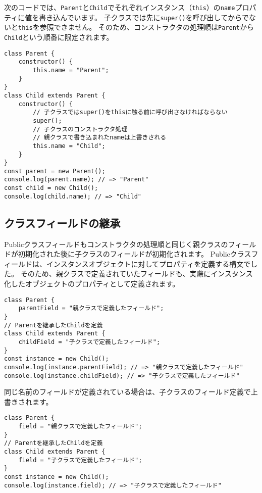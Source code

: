 次のコードでは、\texttt{Parent}と\texttt{Child}でそれぞれインスタンス（\texttt{this}）の\texttt{name}プロパティに値を書き込んでいます。
子クラスでは先に\texttt{super()}を呼び出してからでないと\texttt{this}を参照できません。
そのため、コンストラクタの処理順は\texttt{Parent}から\texttt{Child}という順番に限定されます。

\begin{lstlisting}
class Parent {
    constructor() {
        this.name = "Parent";
    }
}
class Child extends Parent {
    constructor() {
        // 子クラスではsuper()をthisに触る前に呼び出さなければならない
        super();
        // 子クラスのコンストラクタ処理
        // 親クラスで書き込まれたnameは上書きされる
        this.name = "Child";
    }
}
const parent = new Parent();
console.log(parent.name); // => "Parent"
const child = new Child();
console.log(child.name); // => "Child"
\end{lstlisting}

\hypertarget{class-fields-inheritance}{%
\subsection{クラスフィールドの継承}\label{class-fields-inheritance}}

Publicクラスフィールドもコンストラクタの処理順と同じく親クラスのフィールドが初期化された後に子クラスのフィールドが初期化されます。
Publicクラスフィールドは、インスタンスオブジェクトに対してプロパティを定義する構文でした。
そのため、親クラスで定義されていたフィールドも、実際にインスタンス化したオブジェクトのプロパティとして定義されます。

\begin{lstlisting}
class Parent {
    parentField = "親クラスで定義したフィールド";
}
// Parentを継承したChildを定義
class Child extends Parent {
    childField = "子クラスで定義したフィールド";
}
const instance = new Child();
console.log(instance.parentField); // => "親クラスで定義したフィールド"
console.log(instance.childField); // => "子クラスで定義したフィールド"
\end{lstlisting}

同じ名前のフィールドが定義されている場合は、子クラスのフィールド定義で上書きされます。

\begin{lstlisting}
class Parent {
    field = "親クラスで定義したフィールド";
}
// Parentを継承したChildを定義
class Child extends Parent {
    field = "子クラスで定義したフィールド";
}
const instance = new Child();
console.log(instance.field); // => "子クラスで定義したフィールド"
\end{lstlisting}

